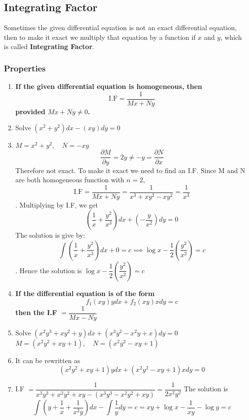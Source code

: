 \documentclass[a4paper, titlepage]{article}
\begin{document}
            \subsection{Integrating Factor}
            Sometimes the given differential equation is not an exact differential equation, then to make it exact we multiply that equation by a function if $x$ and $y$, which is called \textbf{Integrating Factor}.
            \subsubsection{Properties}
            \begin{enumerate}[label=\textbf{\arabic*.}]
                \item \textbf{If the given differential equation is homogeneous, then \[ \text{I.F} = \dfrac{1}{Mx + Ny} \] provided $Mx + Ny \neq 0$.}
                \item[] {Solve} $(x^2 + y^2)dx - (xy)dy = 0$
                \item[] $M = x^2 + y^2, \quad N = -xy$
                \[ \dfrac{\partial M}{\partial y} = 2y \neq -y = \dfrac{\partial N}{\partial x} \]
                Therefore not exact. To make it exact we need to find an I.F. Since M and N are both homogeneous function with $n = 2$, \[ \text{I.F} = \dfrac{1}{Mx + Ny} = \dfrac{1}{x^3 + xy^2 - xy^2} = \dfrac{1}{x^3} \]. Multiplying by I.F, we get 
                \[ \left( \dfrac{1}{x} + \dfrac{y^2}{x^3} \right)dx + \left( -\dfrac{y}{x^2} \right)dy = 0 \]
                The solution is give by: \[ \displaystyle\int \left(\dfrac{1}{x} + \dfrac{y^2}{x^3} \right)dx + 0 = c \implies \log x - \dfrac{1}{2} \left( \dfrac{y^2}{x^2} \right) = c\]. Hence the solution is $\log x - \dfrac{1}{2} \left( \dfrac{y^2}{x^2} \right) = c$
                \item \textbf{If the differential equation is of the form $$f_1(xy)ydx + f_2(xy)xdy = c$$ then the I.F $= \dfrac{1}{Mx - Ny}$}
                \item[] Solve $(x^2y^3 + xy^2 + y)dx + (x^3y^2 - x^2y + x)dy = 0$ \hfill \\
                $M = (x^2y^2 + xy + 1), \quad N = (x^2y^2 - xy + 1)$
                \item[] It can be rewritten as \[ (x^2y^2 + xy + 1)ydx + (x^2y^2 - xy + 1)xdy = 0 \]
                \item[] I.F $= \dfrac{1}{ x^3y^3 + x^2y^2 + xy - (x^3y^3 - x^2y^2 + xy)} = \dfrac{1}{2x^2y^2}$
                The solution is \[ \displaystyle\int \left( y + \dfrac{1}{x} + \dfrac{1}{x^2y} \right)dx - \displaystyle\int \dfrac{1}{y}dy = c  = xy + \log x - \dfrac{1}{xy} - \log y = c\]

\end{enumerate}
\end{document}
